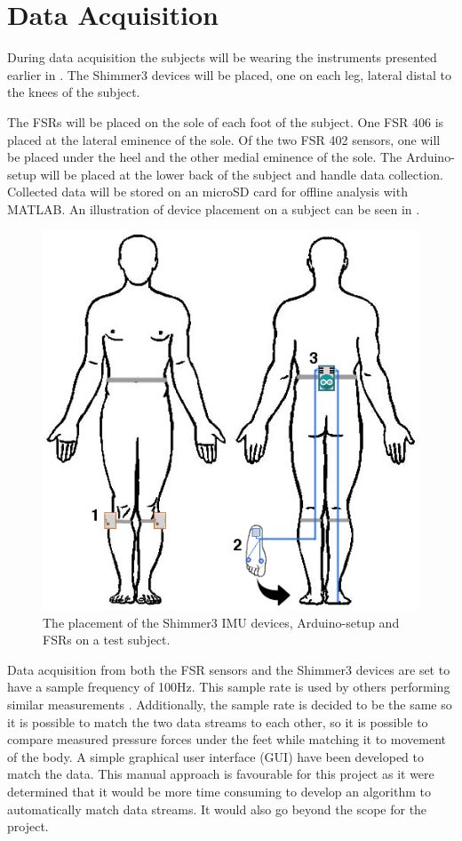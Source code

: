 \section{Data Acquisition}

During data acquisition the subjects will be wearing the instruments presented earlier in . The Shimmer3 devices will be placed, one on each leg, lateral distal to the knees of the subject.

The FSRs will be placed on the sole of each foot of the subject. One FSR 406 is placed at the lateral eminence of the sole. Of the two FSR 402 sensors, one will be placed under the heel and the other medial eminence of the sole. The Arduino-setup will be placed at the lower back of the subject and handle data collection. Collected data will be stored on an microSD card for offline analysis with MATLAB. An illustration of device placement on a subject can be seen in .


\begin{figure}[H]
	\includegraphics[width=.6\textwidth]{figures/bodySysSetup}
	\caption{The placement of the Shimmer3 IMU devices, Arduino-setup and FSRs on a test subject.}
	\label{fig:bodySysSetup}  %
\end{figure}

Data acquisition from both the FSR sensors and the Shimmer3 devices are set to have a sample frequency of 100Hz. This sample rate is used by others performing similar measurements \cite{Verkerke2005, Byun2016, Sherwani2016}. Additionally, the sample rate is decided to be the same so it is possible to match the two data streams to each other, so it is possible to compare measured pressure forces under the feet while matching it to movement of the body. A simple graphical user interface (GUI) have been developed to match the data. This manual approach is favourable for this project as it were determined that it would be more time consuming to develop an algorithm to automatically match data streams. It would also go beyond the scope for the project.

